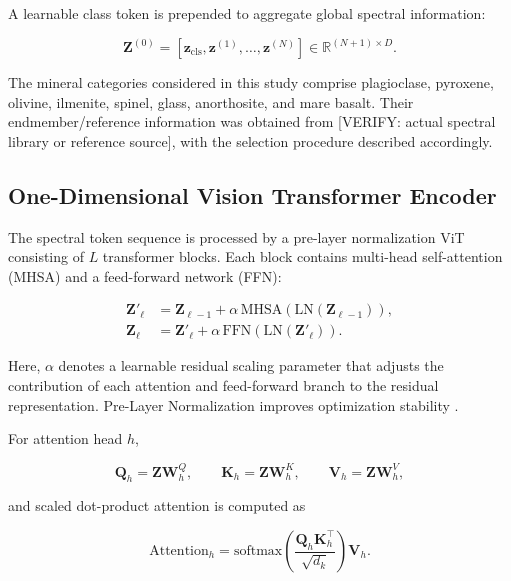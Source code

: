 \documentclass[runningheads]{llncs}
\begin{document}
A learnable class token is prepended to aggregate global spectral
information:

\begin{equation}
\mathbf{Z}^{(0)}
=
[\mathbf{z}_{\mathrm{cls}},
\mathbf{z}^{(1)},\ldots,\mathbf{z}^{(N)}]
\in\mathbb{R}^{(N+1)\times D}.
\label{eq:input_sequence}
\end{equation}

The mineral categories
considered in this study comprise plagioclase, pyroxene, olivine,
ilmenite, spinel, glass, anorthosite, and mare basalt. Their
endmember/reference information was obtained from
[VERIFY: actual spectral library or reference source], with the
selection procedure described accordingly.

\subsection{One-Dimensional Vision Transformer Encoder}
\label{subsec:encoder}

The spectral token sequence is processed by a pre-layer
normalization ViT consisting of $L$ transformer blocks. Each block
contains multi-head self-attention (MHSA) and a feed-forward network
(FFN):

\begin{align}
\mathbf{Z}'_{\ell}
&=
\mathbf{Z}_{\ell-1}
+
\alpha\,\mathrm{MHSA}
\left(\mathrm{LN}(\mathbf{Z}_{\ell-1})\right),
\\
\mathbf{Z}_{\ell}
&=
\mathbf{Z}'_{\ell}
+
\alpha\,\mathrm{FFN}
\left(\mathrm{LN}(\mathbf{Z}'_{\ell})\right).
\label{eq:transformer_block}
\end{align}

Here, $\alpha$ denotes a learnable residual scaling parameter
that adjusts the contribution of each attention and feed-forward
branch to the residual representation.
Pre-Layer Normalization improves optimization stability
\cite{xiong2020layernorm}.

For attention head $h$,

\begin{equation}
\mathbf{Q}_{h}=\mathbf{Z}\mathbf{W}_{h}^{Q},
\qquad
\mathbf{K}_{h}=\mathbf{Z}\mathbf{W}_{h}^{K},
\qquad
\mathbf{V}_{h}=\mathbf{Z}\mathbf{W}_{h}^{V},
\end{equation}

and scaled dot-product attention is computed as

\begin{equation}
\mathrm{Attention}_{h}
=
\mathrm{softmax}
\left(
\frac{\mathbf{Q}_{h}\mathbf{K}_{h}^{\top}}
{\sqrt{d_k}}
\right)
\mathbf{V}_{h}.
\label{eq:attention}
\end{equation}
\end{document}
